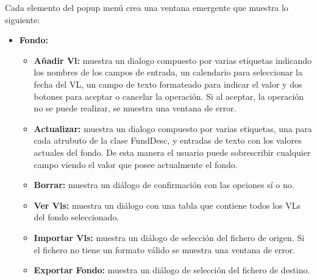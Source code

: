 \documentclass[12pt, a4paper]{book}
\begin{document}
Cada elemento del popup menú crea una ventana emergente que muestra lo siguiente:

\begin{itemize}
	\item \textbf{Fondo:}
	\begin{itemize}
		\item \textbf{Añadir Vl:} muestra un dialogo compuesto por varias etiquetas indicando los nombres de  los campos de entrada, un calendario para seleccionar la fecha del \gls{VL}, un campo de texto formateado para indicar el valor y dos botones para aceptar o cancelar la operación. Si al aceptar, la operación no se puede realizar, se muestra una ventana de error.
		\item \textbf{Actualizar:} muestra un dialogo compuesto por varias etiquetas, una para cada atrubuto de la clase FundDesc, y entradas de texto con los valores actuales del fondo. De esta manera el usuario puede sobrescribir cualquier campo viendo el valor que posee actualmente el fondo. 
		\item \textbf{Borrar:} muestra un diálogo de confirmación con las opciones sí o no.
		\item \textbf{Ver Vls:} muestra un diálogo con una tabla que contiene todos los \gls{VL}s del fondo seleccionado.
		\item \textbf{Importar Vls:} muestra un diálogo de selección del fichero de origen. Si el fichero no tiene un formato válido se muestra una ventana de error.
		\item \textbf{Exportar Fondo:} muestra un diálogo de selección del fichero de destino.
	\end{itemize}
\end{itemize}
\newpage
\end{document}
